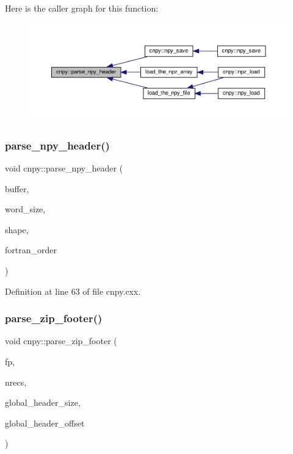 Here is the caller graph for this function\+:
\nopagebreak
\begin{figure}[H]
\begin{center}
\leavevmode
\includegraphics[width=350pt]{namespacecnpy_adb801e369cfcf2e47c4b0348dcb54787_icgraph}
\end{center}
\end{figure}
\mbox{\label{namespacecnpy_a9ea9e228db8c205a039b7763c74829e8}} 
\subsubsection{\texorpdfstring{parse\+\_\+npy\+\_\+header()}{parse\_npy\_header()}\hspace{0.1cm}{\footnotesize\ttfamily [2/2]}}
{\footnotesize\ttfamily void cnpy\+::parse\+\_\+npy\+\_\+header (\begin{DoxyParamCaption}\item[{unsigned char $\ast$}]{buffer,  }\item[{size\+\_\+t \&}]{word\+\_\+size,  }\item[{std\+::vector$<$ size\+\_\+t $>$ \&}]{shape,  }\item[{bool \&}]{fortran\+\_\+order }\end{DoxyParamCaption})}



Definition at line 63 of file cnpy.\+cxx.

\mbox{\label{namespacecnpy_a0feec097a7dbb48c449bc7e9b27b7fd6}} 
\subsubsection{\texorpdfstring{parse\+\_\+zip\+\_\+footer()}{parse\_zip\_footer()}}
{\footnotesize\ttfamily void cnpy\+::parse\+\_\+zip\+\_\+footer (\begin{DoxyParamCaption}\item[{F\+I\+LE $\ast$}]{fp,  }\item[{uint16\+\_\+t \&}]{nrecs,  }\item[{size\+\_\+t \&}]{global\+\_\+header\+\_\+size,  }\item[{size\+\_\+t \&}]{global\+\_\+header\+\_\+offset }\end{DoxyParamCaption})}



